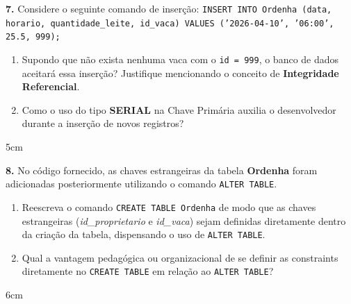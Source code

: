 \documentclass[12pt]{article}
\begin{document}
\vspace{0.5cm}

\textbf{7.} Considere o seguinte comando de inserção: 
\texttt{INSERT INTO Ordenha (data, horario, quantidade\_leite, id\_vaca) VALUES ('2026-04-10', '06:00', 25.5, 999);}
\begin{enumerate}[label=\alph*)]
  \item Supondo que não exista nenhuma vaca com o \texttt{id = 999}, o banco de dados aceitará essa inserção? Justifique mencionando o conceito de \textbf{Integridade Referencial}.
  \item Como o uso do tipo \textbf{SERIAL} na Chave Primária auxilia o desenvolvedor durante a inserção de novos registros?
\end{enumerate}
\begin{resposta}{5cm}
\end{resposta}

\vspace{0.5cm}

\textbf{8.} No código fornecido, as chaves estrangeiras da tabela \textbf{Ordenha} foram adicionadas posteriormente utilizando o comando \texttt{ALTER TABLE}.
\begin{enumerate}[label=\alph*)]
  \item Reescreva o comando \texttt{CREATE TABLE Ordenha} de modo que as chaves estrangeiras (\textit{id\_proprietario} e \textit{id\_vaca}) sejam definidas diretamente dentro da criação da tabela, dispensando o uso de \texttt{ALTER TABLE}.
  \item Qual a vantagem pedagógica ou organizacional de se definir as constraints diretamente no \texttt{CREATE TABLE} em relação ao \texttt{ALTER TABLE}?
\end{enumerate}
\begin{resposta}{6cm}
\end{resposta}

\vspace{0.8cm}
\end{document}

